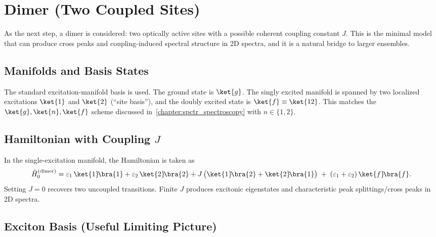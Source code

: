 
\section{Dimer (Two Coupled Sites)}
\label{sec:model_dimer}


As the next step, a dimer is considered: two optically active sites with a possible coherent coupling constant $J$. This is the minimal model that can produce cross peaks and coupling-induced spectral structure in 2D spectra, and it is a natural bridge to larger ensembles.

\subsection{Manifolds and Basis States}


The standard excitation-manifold basis is used. The ground state is $\ket{g}$. The singly excited manifold is spanned by two localized excitations $\ket{1}$ and $\ket{2}$ (``site basis''), and the doubly excited state is $\ket{f}\equiv\ket{12}$.
This matches the \, $\ket{g},\ket{n},\ket{f}$ scheme discussed in~\autoref{chapter:spctr_spectroscopy} with $n\in\{1,2\}$.

\subsection{Hamiltonian with Coupling \texorpdfstring{$J$}{J}}


In the single-excitation manifold, the Hamiltonian is taken as
\begin{equation*}
	\hat{H}_{0}^{(\mathrm{dimer})}
	= \varepsilon_1\,\ket{1}\!\bra{1} + \varepsilon_2\,\ket{2}\!\bra{2}
	+ J\,\big(\ket{1}\!\bra{2}+\ket{2}\!\bra{1}\big)
	\; +\; (\varepsilon_1+\varepsilon_2)\,\ket{f}\!\bra{f}.
\end{equation*}
Setting $J=0$ recovers two uncoupled transitions. Finite $J$ produces excitonic eigenstates and characteristic peak splittings/cross peaks in 2D spectra.

\subsection{Exciton Basis (Useful Limiting Picture)}


